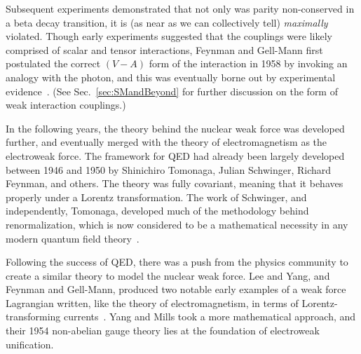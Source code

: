 Subsequent experiments demonstrated that not only was parity non-conserved in a beta decay transition, it is (as near as we can collectively tell) \emph{maximally} violated.  
Though early experiments suggested that the couplings were likely comprised of 
scalar and tensor interactions, Feynman and Gell-Mann first postulated the correct $(V-A)$ form of the interaction in 1958 by invoking an analogy with the photon, and this was eventually borne out by experimental evidence~\cite{FeynmanGellMann1958}.  (See Sec.~\ref{sec:SMandBeyond} for further discussion on the form of weak interaction couplings.)

In the following years, the theory behind the nuclear weak force was developed further, and eventually merged with the theory of electromagnetism as the electroweak force.  The framework for \ac{QED} had already been largely developed between 1946 and 1950 by Shinichiro Tomonaga, Julian Schwinger, Richard Feynman, and others.  The theory was fully covariant, meaning that it behaves properly under a Lorentz transformation.  The work of Schwinger, and independently, Tomonaga, developed much of the methodology behind renormalization, which is now considered to be a mathematical necessity in any modern quantum field theory~\cite{tomonaga1946,schwinger1948covariant,feynman1949spacetime,feynman1949positrons,feynman1950,dyson1949theories}.  ~



Following the success of QED, there was a push from the physics community to create a similar theory to model the nuclear weak force.  
%
Lee and Yang, and Feynman and Gell-Mann, produced two notable early examples of a weak force Lagrangian written, like the theory of electromagnetism, in terms of Lorentz-transforming currents~\cite{LeeYang,FeynmanGellMann1958}.  Yang and Mills took a more mathematical approach, and their 1954 non-abelian gauge theory \cite{YangMills1954} lies at the foundation of electroweak unification.  
%

